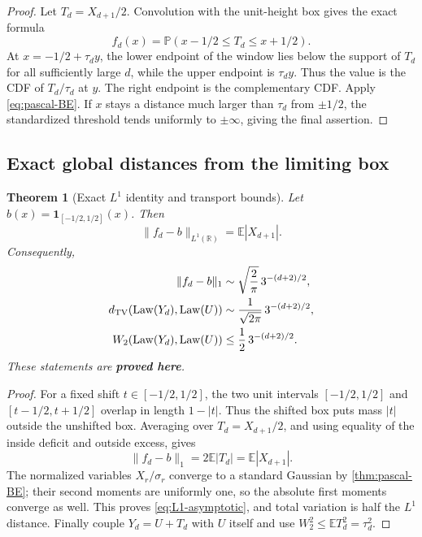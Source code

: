 \documentclass[11pt,oneside]{article}
\numberwithin{equation}{section}
\newtheorem{theorem}{Theorem}[section]
\theoremstyle{definition}
\theoremstyle{remark}
\newcommand{\R}{\mathbb R}
\newcommand{\E}{\mathbb E}
\newcommand{\Prob}{\mathbb P}
\newcommand{\Law}{\operatorname{Law}}
\newcommand{\statusproved}{\textcolor{deepgreen}{\textbf{proved here}}}
\begin{document}
\begin{proof}
Let $T_d=X_{d+1}/2$.  Convolution with the unit-height box gives the exact formula
\begin{equation}
 f_d(x)=\Prob(x-1/2\le T_d\le x+1/2).
 \label{eq:fd-window}
\end{equation}
At $x=-1/2+\tau_dy$, the lower endpoint of the window lies below the support of $T_d$ for
all sufficiently large $d$, while the upper endpoint is $\tau_dy$.  Thus the value is the
CDF of $T_d/\tau_d$ at $y$.  The right endpoint is the complementary CDF.  Apply
\eqref{eq:pascal-BE}.  If $x$ stays a distance much larger than $\tau_d$ from
$\pm1/2$, the standardized threshold tends uniformly to $\pm\infty$, giving the final
assertion.
\end{proof}

\subsection{Exact global distances from the limiting box}

\begin{theorem}[Exact $L^1$ identity and transport bounds]
\label{thm:global-box-distance}
Let $b(x)=\mathbf1_{[-1/2,1/2]}(x)$.  Then
\begin{equation}
 \boxed{
 \|f_d-b\|_{L^1(\R)}
 =\E|X_{d+1}|.}
 \label{eq:L1-exact}
\end{equation}
Consequently,
\begin{align}
 \|f_d-b\|_1
 &\sim\sqrt{\frac2\pi}\,3^{-(d+2)/2},
 \label{eq:L1-asymptotic}\\
 d_{\rm TV}(\Law(Y_d),\Law(U))
 &\sim\frac1{\sqrt{2\pi}}\,3^{-(d+2)/2},
 \label{eq:TV-asymptotic}\\
 W_2(\Law(Y_d),\Law(U))
 &\le\frac12\,3^{-(d+2)/2}.
 \label{eq:W2-bound}
\end{align}
These statements are \statusproved.
\end{theorem}

\begin{proof}
For a fixed shift $t\in[-1/2,1/2]$, the two unit intervals
$[-1/2,1/2]$ and $[t-1/2,t+1/2]$ overlap in length $1-|t|$.  Thus the shifted box puts mass
$|t|$ outside the unshifted box.  Averaging over $T_d=X_{d+1}/2$, and using equality of the
inside deficit and outside excess, gives
\[
 \|f_d-b\|_1=2\E|T_d|=\E|X_{d+1}|.
\]
The normalized variables $X_r/\sigma_r$ converge to a standard Gaussian by
\cref{thm:pascal-BE}; their second moments are uniformly one, so the absolute first moments
converge as well.  This proves \eqref{eq:L1-asymptotic}, and total variation is half the
$L^1$ distance.  Finally couple $Y_d=U+T_d$ with $U$ itself and use
$W_2^2\le\E T_d^2=\tau_d^2$.
\end{proof}
\end{document}
